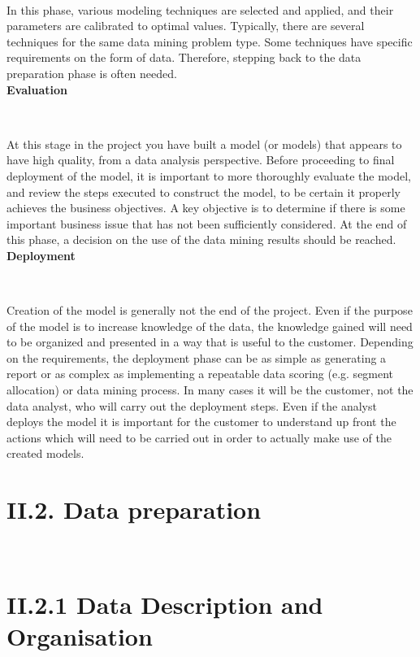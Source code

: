\documentclass[11pt, a4papper]{report}
\theoremstyle{plain}
\theoremstyle{definition}
\theoremstyle{definition}
\theoremstyle{proposition}
\begin{document}
\

In this phase, various modeling techniques are selected and applied, and their parameters are calibrated to optimal values. Typically, there are several techniques for the same data mining problem type. Some techniques have specific requirements on the form of data. Therefore, stepping back to the data preparation phase is often needed.
\\

\textbf{Evaluation}

\

At this stage in the project you have built a model (or models) that appears to have high quality, from a data analysis perspective. Before proceeding to final deployment of the model, it is important to more thoroughly evaluate the model, and review the steps executed to construct the model, to be certain it properly achieves the business objectives. A key objective is to determine if there is some important business issue that has not been sufficiently considered. At the end of this phase, a decision on the use of the data mining results should be reached.
\\

\textbf{Deployment}

\

Creation of the model is generally not the end of the project. Even if the purpose of the model is to increase knowledge of the data, the knowledge gained will need to be organized and presented in a way that is useful to the customer. Depending on the requirements, the deployment phase can be as simple as generating a report or as complex as implementing a repeatable data scoring (e.g. segment allocation) or data mining process. In many cases it will be the customer, not the data analyst, who will carry out the deployment steps. Even if the analyst deploys the model it is important for the customer to understand up front the actions which will need to be carried out in order to actually make use of the created models.
\\



\section*{II.2. Data preparation}

\

\section*{II.2.1 Data Description and Organisation}
\end{document}
